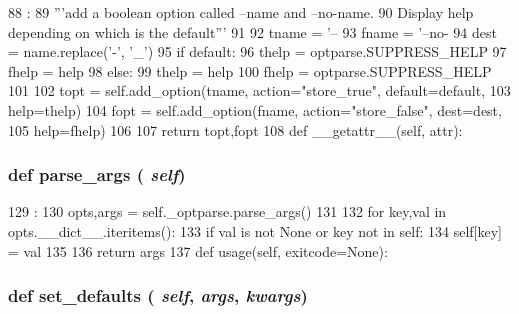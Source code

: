 \begin{DoxyCode}
88                                               :
89         '''add a boolean option called --name and --no-name.
90         Display help depending on which is the default'''
91 
92         tname = '--%
93         fname = '--no-%
94         dest = name.replace('-', '_')
95         if default:
96             thelp = optparse.SUPPRESS_HELP
97             fhelp = help
98         else:
99             thelp = help
100             fhelp = optparse.SUPPRESS_HELP
101 
102         topt = self.add_option(tname, action="store_true", default=default,
103                                help=thelp)
104         fopt = self.add_option(fname, action="store_false", dest=dest,
105                                help=fhelp)
106 
107         return topt,fopt
108 
    def __getattr__(self, attr):
\end{DoxyCode}
\hypertarget{classm5_1_1options_1_1OptionParser_a4354871619b866b2d7855e024477196e}{
\subsubsection[{parse\_\-args}]{\setlength{\rightskip}{0pt plus 5cm}def parse\_\-args ( {\em self})}}
\label{classm5_1_1options_1_1OptionParser_a4354871619b866b2d7855e024477196e}



\begin{DoxyCode}
129                         :
130         opts,args = self._optparse.parse_args()
131 
132         for key,val in opts.__dict__.iteritems():
133             if val is not None or key not in self:
134                 self[key] = val
135 
136         return args
137 
    def usage(self, exitcode=None):
\end{DoxyCode}
\hypertarget{classm5_1_1options_1_1OptionParser_a7dc55681f5d3d244fc2bb24071cca393}{
\subsubsection[{set\_\-defaults}]{\setlength{\rightskip}{0pt plus 5cm}def set\_\-defaults ( {\em self}, \/   {\em args}, \/   {\em kwargs})}}
\label{classm5_1_1options_1_1OptionParser_a7dc55681f5d3d244fc2bb24071cca393}



